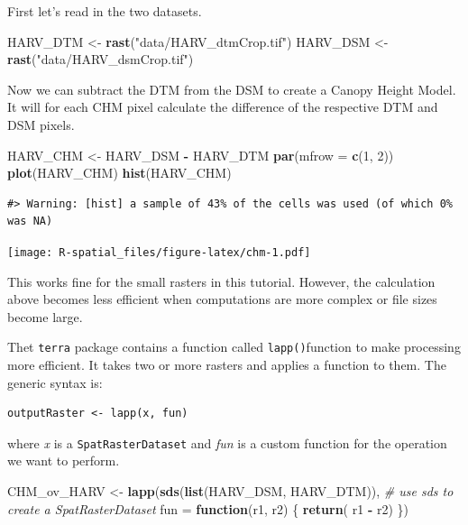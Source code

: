 \documentclass[
]{book}
\newenvironment{Shaded}{\begin{snugshade}}{\end{snugshade}}
\newcommand{\AttributeTok}[1]{\textcolor[rgb]{0.13,0.29,0.53}{#1}}
\newcommand{\CommentTok}[1]{\textcolor[rgb]{0.56,0.35,0.01}{\textit{#1}}}
\newcommand{\ControlFlowTok}[1]{\textcolor[rgb]{0.13,0.29,0.53}{\textbf{#1}}}
\newcommand{\DecValTok}[1]{\textcolor[rgb]{0.00,0.00,0.81}{#1}}
\newcommand{\FunctionTok}[1]{\textcolor[rgb]{0.13,0.29,0.53}{\textbf{#1}}}
\newcommand{\NormalTok}[1]{#1}
\newcommand{\OtherTok}[1]{\textcolor[rgb]{0.56,0.35,0.01}{#1}}
\newcommand{\SpecialCharTok}[1]{\textcolor[rgb]{0.81,0.36,0.00}{\textbf{#1}}}
\newcommand{\StringTok}[1]{\textcolor[rgb]{0.31,0.60,0.02}{#1}}
\begin{document}
First let's read in the two datasets.

\begin{Shaded}
\begin{Highlighting}[]
\NormalTok{HARV\_DTM }\OtherTok{\textless{}{-}} \FunctionTok{rast}\NormalTok{(}\StringTok{"data/HARV\_dtmCrop.tif"}\NormalTok{)}
\NormalTok{HARV\_DSM }\OtherTok{\textless{}{-}} \FunctionTok{rast}\NormalTok{(}\StringTok{"data/HARV\_dsmCrop.tif"}\NormalTok{)}
\end{Highlighting}
\end{Shaded}

Now we can subtract the DTM from the DSM to create a Canopy Height Model. It will for each CHM pixel calculate the difference of the respective DTM and DSM pixels.

\begin{Shaded}
\begin{Highlighting}[]
\NormalTok{HARV\_CHM }\OtherTok{\textless{}{-}}\NormalTok{ HARV\_DSM }\SpecialCharTok{{-}}\NormalTok{ HARV\_DTM}
\FunctionTok{par}\NormalTok{(}\AttributeTok{mfrow =} \FunctionTok{c}\NormalTok{(}\DecValTok{1}\NormalTok{, }\DecValTok{2}\NormalTok{))}
\FunctionTok{plot}\NormalTok{(HARV\_CHM)}
\FunctionTok{hist}\NormalTok{(HARV\_CHM)}
\end{Highlighting}
\end{Shaded}

\begin{verbatim}
#> Warning: [hist] a sample of 43% of the cells was used (of which 0% was NA)
\end{verbatim}

\texttt{[image: R-spatial\_files/figure-latex/chm-1.pdf]}

This works fine for the small rasters in this tutorial. However, the calculation above becomes less efficient when computations are more complex or file sizes become large.

Thet \texttt{terra} package contains a function called \texttt{lapp()}function to make processing more efficient. It takes two or more rasters and applies a function to them. The generic syntax is:

\begin{verbatim}
outputRaster <- lapp(x, fun)
\end{verbatim}

where \emph{x} is a \texttt{SpatRasterDataset} and \emph{fun} is a custom function for the operation we want to perform.

\begin{Shaded}
\begin{Highlighting}[]
\NormalTok{CHM\_ov\_HARV }\OtherTok{\textless{}{-}} \FunctionTok{lapp}\NormalTok{(}\FunctionTok{sds}\NormalTok{(}\FunctionTok{list}\NormalTok{(HARV\_DSM, HARV\_DTM)), }\CommentTok{\# use sds to create a SpatRasterDataset}
                    \AttributeTok{fun =} \ControlFlowTok{function}\NormalTok{(r1, r2) \{ }
                      \FunctionTok{return}\NormalTok{( r1 }\SpecialCharTok{{-}}\NormalTok{ r2) }
\NormalTok{                      \})}
\end{Highlighting}
\end{Shaded}
\end{document}
